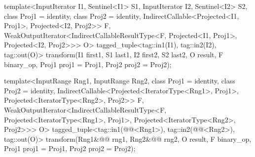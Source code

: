 \begin{addedblock}
\begin{itemdecl}
template<InputIterator I1, Sentinel<I1> S1, InputIterator I2, Sentinel<I2> S2,
    class Proj1 = identity, class Proj2 = identity,
    IndirectCallable<Projected<I1, Proj1>, Projected<I2, Proj2>> F,
    WeakOutputIterator<IndirectCallableResultType<F, Projected<I1, Proj1>,
      Projected<I2, Proj2>>> O>
  tagged_tuple<tag::in1(I1), tag::in2(I2), tag::out(O)>
    transform(I1 first1, S1 last1, I2 first2, S2 last2, O result,
              F binary_op, Proj1 proj1 = Proj1{}, Proj2 proj2 = Proj2{});

template<InputRange Rng1, InputRange Rng2,
    class Proj1 = identity, class Proj2 = identity,
    IndirectCallable<Projected<IteratorType<Rng1>, Proj1>,
      Projected<IteratorType<Rng2>, Proj2>> F,
    WeakOutputIterator<IndirectCallableResultType<F,
      Projected<IteratorType<Rng1>, Proj1>, Projected<IteratorType<Rng2>, Proj2>>> O>
  tagged_tuple<tag::in1(@@<Rng1>),
               tag::in2(@@<Rng2>),
               tag::out(O)>
    transform(Rng1&@\newtxt{\&}@ rng1, Rng2&@\newtxt{\&}@ rng2, O result,
              F binary_op, Proj1 proj1 = Proj1{}, Proj2 proj2 = Proj2{});
\end{itemdecl}
\end{addedblock}

